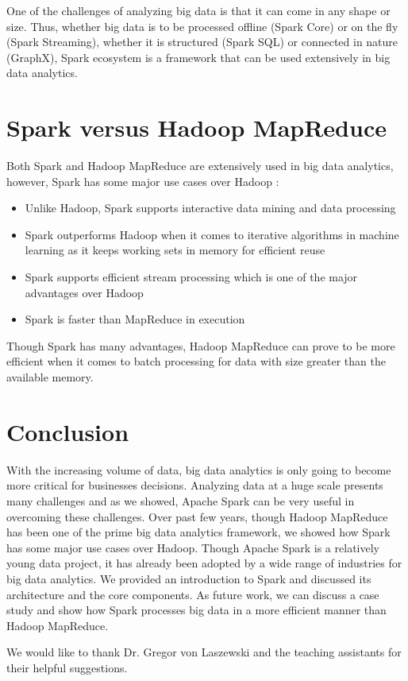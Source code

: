 \documentclass[sigconf]{acmart}
\begin{document}
One of the challenges of analyzing big data is that it can come in any shape or size. Thus, whether big data is to be processed offline (Spark Core) or on the fly (Spark Streaming), whether it is structured (Spark SQL) or connected in nature (GraphX), Spark ecosystem is a framework that can be used extensively in big data analytics.

\section{Spark versus Hadoop MapReduce}
Both Spark and Hadoop MapReduce are extensively used in big data analytics, however, Spark has some major use cases over Hadoop \cite{verma2016big-p3}:
\begin{itemize}
	\item Unlike Hadoop, Spark supports interactive data mining and data processing
  \item Spark outperforms Hadoop when it comes to iterative algorithms in machine learning as it keeps working sets in memory for efficient reuse  
  \item Spark supports efficient stream processing which is one of the major advantages over Hadoop
  \item Spark is faster than MapReduce in execution
\end{itemize}

Though Spark has many advantages, Hadoop MapReduce can prove to be more efficient when it comes to batch processing for data with size greater than the available memory.

\section{Conclusion}
With the increasing volume of data, big data analytics is only going to become more critical for businesses decisions. Analyzing data at a huge scale presents many challenges and as we showed, Apache Spark can be very useful in overcoming these challenges. Over past few years, though Hadoop MapReduce has been one of the prime big data analytics framework, we showed how Spark has some major use cases over Hadoop. Though Apache Spark is a relatively young data project, it has already been adopted by a wide range of industries for big data analytics. We provided an introduction to Spark and discussed its architecture and the core components. As future work, we can discuss a case study and show how Spark processes big data in a more efficient manner than Hadoop MapReduce.

\begin{acks}

  We would like to thank Dr. Gregor von Laszewski and the teaching assistants for their helpful suggestions. 

\end{acks}


 
\end{document}
